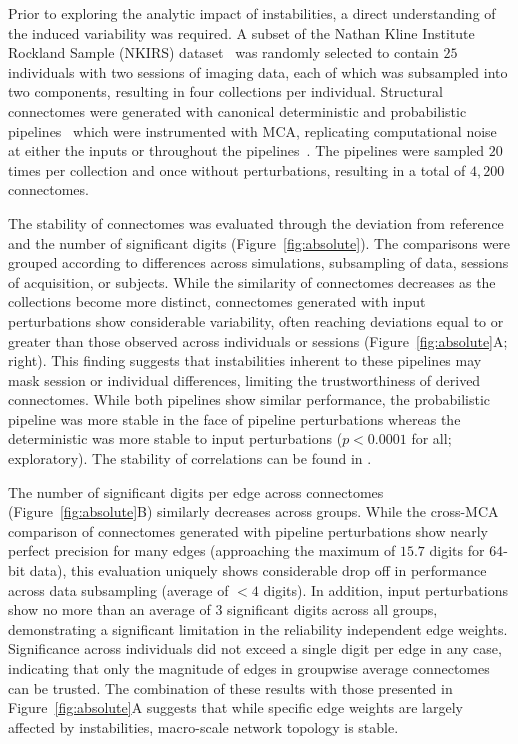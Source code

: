 \documentclass[fleqn,10pt]{SelfArx} %
\begin{document}
Prior to exploring the analytic impact of instabilities, a direct understanding of the induced variability was
required. A subset of the Nathan Kline Institute Rockland Sample (NKIRS) dataset~\cite{Nooner2012-eg} was randomly
selected to contain $25$ individuals with two sessions of imaging data, each of which was subsampled into two
components, resulting in four collections per individual. Structural connectomes were generated with canonical
deterministic and probabilistic pipelines~\cite{Garyfallidis2014-ql,Garyfallidis2012-gg} which were instrumented with
MCA, replicating computational noise at either the inputs or throughout the pipelines~\cite{Denis2016-wo,Kiar2020-lb}.
The pipelines were sampled $20$ times per collection and once without perturbations, resulting in a total of $4,200$
connectomes.

The stability of connectomes was evaluated through the deviation from reference and the number of significant digits
(Figure~\ref{fig:absolute}). The comparisons were grouped according to differences across simulations, subsampling
of data, sessions of acquisition, or subjects. While the similarity of connectomes decreases as the collections become
more distinct, connectomes generated with input perturbations show considerable variability, often reaching deviations
equal to or greater than those observed across individuals or sessions (Figure~\ref{fig:absolute}A; right). This
finding suggests that instabilities inherent to these pipelines may mask session or individual differences, limiting
the trustworthiness of derived connectomes. While both pipelines show similar performance, the probabilistic pipeline
was more stable in the face of pipeline perturbations whereas the deterministic was more stable to input perturbations
($p < 0.0001$ for all; exploratory). The stability of correlations can be found in .

The number of significant digits per edge across connectomes (Figure~\ref{fig:absolute}B) similarly decreases across
groups. While the cross-MCA comparison of connectomes generated with pipeline perturbations show nearly perfect
precision for many edges (approaching the maximum of $15.7$ digits for $64$-bit data), this evaluation uniquely shows
considerable drop off in performance across data subsampling (average of $< 4$ digits). In addition, input
perturbations show no more than an average of $3$ significant digits across all groups, demonstrating a significant
limitation in the reliability independent edge weights. Significance across individuals did not exceed a single digit
per edge in any case, indicating that only the magnitude of edges in groupwise average connectomes can be trusted. The
combination of these results with those presented in Figure~\ref{fig:absolute}A suggests that while specific edge
weights are largely affected by instabilities, macro-scale network topology is stable.
\end{document}
